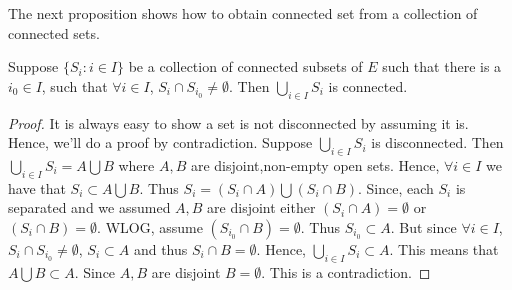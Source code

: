 The next proposition shows how to obtain connected set from a collection of connected sets.
\begin{Proposition}[name=Collection of connected sets]
    Suppose $\left.\lbrace S_i : i \in I \rbrace\right.$ be a collection of connected subsets of $E$
    such that there is a $i_0 \in I$, such that $\forall i \in I$, $S_i \cap S_{i_0} \neq
    \emptyset$. Then $\bigcup_{i \in I}S_{i}$ is connected.
\end{Proposition}
\begin{proof}
    It is always easy to show a set is not disconnected by assuming it is. Hence, we'll do a proof
    by contradiction. Suppose $\bigcup_{i \in I}S_{i}$ is disconnected. Then $\bigcup_{i \in
	I}S_{i} = A \bigcup B$ where $A,B$ are disjoint,non-empty open sets. Hence, $\forall i \in
    I$ we have that $S_i \subset A \bigcup B$. Thus $S_i = \left(S_i \cap A\right) \bigcup \left(S_i
	\cap B\right)$. Since, each $S_i$ is separated and we assumed $A,B$ are disjoint either
    $\left(S_i \cap A\right) = \emptyset$ or $\left(S_i \cap B\right) = \emptyset$. WLOG, assume
    $\left(S_{i_0} \cap B\right) = \emptyset$. Thus $S_{i_0} \subset A$. But since $\forall i \in
    I$, $S_i \cap S_{i_0} \neq \emptyset$, $S_i \subset A$ and thus $S_i \cap B = \emptyset$.
    Hence, $\bigcup_{i \in I}S_{i} \subset A$. This means that $A \bigcup B \subset A$. Since $A,B$
    are disjoint $B = \emptyset$. This is a contradiction. 

\end{proof}
